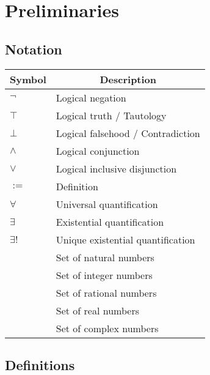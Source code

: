 \chapter{Preliminaries}

\section{Notation}

\begin{center}
    \begin{tabular}{>{\centering}m{1.5cm} m{6cm}}
    \toprule
    \textbf{Symbol} & \multicolumn{1}{c}{\textbf{Description}} \\
    \midrule
    \(\lnot\) & Logical negation \\
    \(\top\)  & Logical truth / Tautology \\
    \(\bot\)  & Logical falsehood / Contradiction \\
    \(\land\) & Logical conjunction \\
    \(\lor\) & Logical inclusive disjunction \\
    \(:=\)   & Definition \\
    \(\forall\) & Universal quantification \\
    \(\exists\) & Existential quantification \\
    \(\exists!\) & Unique existential quantification \\
    \N & Set of natural numbers \\
    \Z & Set of integer numbers \\
    \Q & Set of rational numbers \\
    \R & Set of real numbers \\
    \C & Set of complex numbers \\
    \bottomrule
    \end{tabular}
\end{center}


\section{Definitions}



